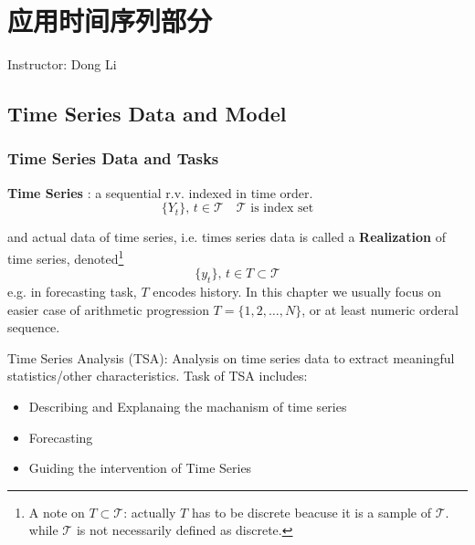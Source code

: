 \section{应用时间序列部分}
\begin{center}
    Instructor: Dong Li
\end{center}


\subsection{Time Series Data and Model}


\subsubsection{Time Series Data and Tasks}
    \textbf{Time Series} : a sequential r.v. indexed in time order.
    \begin{equation}
        \{Y_t\},\,t\in \mathcal{T}\quad \mathcal{T}\text{ is index set} 
    \end{equation}

    and actual data of time series, i.e. times series data is called a \textbf{Realization}  of time series, denoted\footnote{A note on $ T\subset \mathcal{T} $: actually $ T $ has to be discrete beacuse it is a sample of $ \mathcal{T} $. while $ \mathcal{T} $ is not necessarily defined as discrete.}
    \[
        \{y_t\},\,t\in  T\subset\mathcal{T}
    \]
    e.g. in forecasting task, $ T $ encodes history. In this chapter we usually focus on easier case of arithmetic progression $ T=\{1,2,\dots,N\} $, or at least numeric orderal sequence.

    Time Series Analysis (TSA): Analysis on time series data to extract meaningful statistics/other characteristics. Task of TSA includes:
    \begin{itemize}[topsep=2pt,itemsep=0pt]
        \item Describing and Explanaing the machanism of time series 
        \item Forecasting
        \item Guiding the intervention of Time Series
    \end{itemize}

